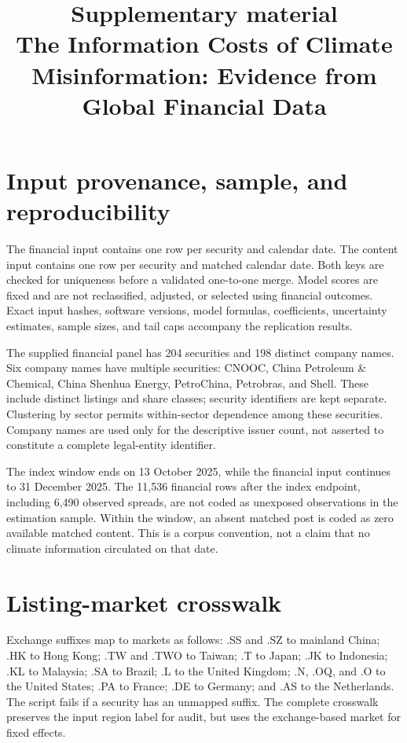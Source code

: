 \documentclass[11pt,a4paper]{article}
\title{Supplementary material\\The Information Costs of Climate Misinformation: Evidence from Global Financial Data}
\author{}\date{}
\begin{document}
\maketitle
\section{Input provenance, sample, and reproducibility}
The financial input contains one row per security and calendar date. The content input contains one row per security and matched calendar date. Both keys are checked for uniqueness before a validated one-to-one merge. Model scores are fixed and are not reclassified, adjusted, or selected using financial outcomes. Exact input hashes, software versions, model formulas, coefficients, uncertainty estimates, sample sizes, and tail caps accompany the replication results.

The supplied financial panel has 204 securities and 198 distinct company names. Six company names have multiple securities: CNOOC, China Petroleum \& Chemical, China Shenhua Energy, PetroChina, Petrobras, and Shell. These include distinct listings and share classes; security identifiers are kept separate. Clustering by sector permits within-sector dependence among these securities. Company names are used only for the descriptive issuer count, not asserted to constitute a complete legal-entity identifier.

The index window ends on 13 October 2025, while the financial input continues to 31 December 2025. The 11,536 financial rows after the index endpoint, including 6,490 observed spreads, are not coded as unexposed observations in the estimation sample. Within the window, an absent matched post is coded as zero available matched content. This is a corpus convention, not a claim that no climate information circulated on that date.





\section{Listing-market crosswalk}
Exchange suffixes map to markets as follows: .SS and .SZ to mainland China; .HK to Hong Kong; .TW and .TWO to Taiwan; .T to Japan; .JK to Indonesia; .KL to Malaysia; .SA to Brazil; .L to the United Kingdom; .N, .OQ, and .O to the United States; .PA to France; .DE to Germany; and .AS to the Netherlands. The script fails if a security has an unmapped suffix. The complete crosswalk preserves the input region label for audit, but uses the exchange-based market for fixed effects.
\end{document}
